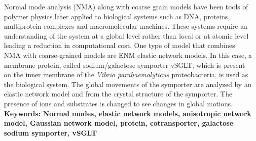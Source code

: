 Normal mode analysis (NMA) along with coarse grain models have been tools of polymer physics later applied to biological systems such as DNA, proteins, multiprotein complexes and macromolecular machines. These systems require an understanding of the system at a global level rather than local or at atomic level leading a reduction in computational cost. One type of model that combines NMA with coarse-grained models are ENM elastic network models. In this case, a membrane protein, called sodium/galactose symporter vSGLT, which is present on the inner membrane of the \textit{Vibrio parahaemolyticus} proteobacteria, is used as the biological system. The global movements of the symporter are analyzed by an elastic network model and from the crystal structure of the symporter. The presence of ions and substrates is changed to see changes in global motions. \\

\textbf{\small Keywords: Normal modes, elastic network models, anisotropic network model, Gaussian network model, protein, cotransporter, galactose sodium symporter, vSGLT}\\